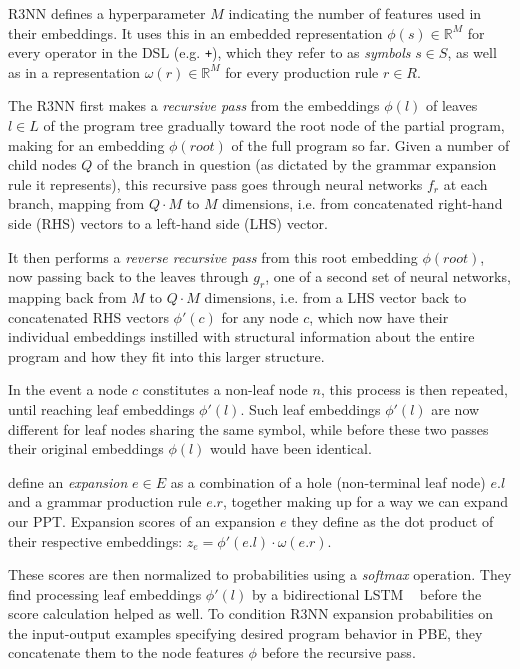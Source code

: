 \documentclass{article} %
\begin{document}
R3NN defines a hyperparameter $M$ indicating the number of features used in their embeddings.
It uses this in an embedded representation $\phi(s) \in \mathbb{R}^M$
for every operator in the DSL (e.g. \verb|+|), which they refer to as \emph{symbols} $s \in S$,
as well as in a representation $\omega(r) \in \mathbb{R}^M$ for every production rule $r \in R$.

The R3NN first makes a \emph{recursive pass} from the embeddings $\phi(l)$
of leaves $l \in L$ of the program tree gradually toward the root node of the partial program,
making for an embedding $\phi(root)$ of the full program so far.
Given a number of child nodes $Q$ of the branch in question
(as dictated by the grammar expansion rule it represents),
this recursive pass goes through neural networks $f_r$ at each branch,
mapping from $Q \cdot M$ to $M$ dimensions,
i.e. from concatenated right-hand side (RHS) vectors to a left-hand side (LHS) vector.

It then performs a \emph{reverse recursive pass} from this root embedding $\phi(root)$,
now passing back to the leaves through $g_r$,
one of a second set of neural networks,
mapping back from $M$ to $Q \cdot M$ dimensions,
i.e. from a LHS vector back to concatenated RHS vectors $\phi'(c)$ for any node $c$,
which now have their individual embeddings instilled with structural information about the entire program and how they fit into this larger structure.

In the event a node $c$ constitutes a non-leaf node $n$,
this process is then repeated, until reaching leaf embeddings $\phi'(l)$.
Such leaf embeddings $\phi'(l)$ are now different for leaf nodes sharing the same symbol,
while before these two passes their original embeddings $\phi(l)$ would have been identical.

\citet{nsps} define an \emph{expansion} $e \in E$ as a combination of a hole (non-terminal leaf node) $e.l$ and a grammar production rule $e.r$, together making up for a way we can expand our PPT.
Expansion scores of an expansion $e$ they define as the dot product of their respective embeddings:
$z_e = \phi'(e.l) \cdot \omega(e.r)$.

These scores are then normalized to probabilities using a \emph{softmax} operation.
They find processing leaf embeddings $\phi'(l)$ by a bidirectional LSTM%
~\citep{huang2015bidirectional} before the score calculation helped as well.
To condition R3NN expansion probabilities on the input-output examples specifying desired program behavior in PBE,
they concatenate them to the node features $\phi$ before the recursive pass.
\end{document}

